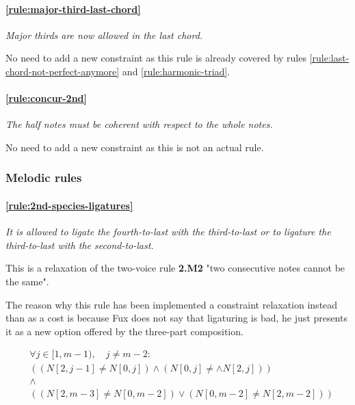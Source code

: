 \paragraph{\hspace{.5cm}\ref{rule:major-third-last-chord}} \textit{Major thirds are now allowed in the last chord.}

No need to add a new constraint as this rule is already covered by rules \ref{rule:last-chord-not-perfect-anymore} and \ref{rule:harmonic-triad}.

\paragraph{\hspace{.5cm}\ref{rule:concur-2nd}} \textit{The half notes must be coherent with respect to the whole notes.}

No need to add a new constraint as this is not an actual rule.

\subsubsection{Melodic rules}

    \paragraph{\hspace{.6cm}\ref{rule:2nd-species-ligatures}} \greendots \textit{It is allowed to ligate the fourth-to-last with the third-to-last or to ligature the third-to-last with the second-to-last.}  

    This is a relaxation of the two-voice rule \textbf{2.M2} "two consecutive notes cannot be the same".
    
    The reason why this rule has been implemented a constraint relaxation instead than as a cost is because Fux does not say that ligaturing is bad, he just presents it as a new option offered by the three-part composition.

    \begin{equation}
        \begin{aligned}
            &\forall j \in [1, m-1), \quad j \neq m-2:\\
            &((N[2, j-1] \neq N[0, j]) \land (N[0, j] \neq \land N[2, j])) \\
            &\land \\
            & ((N[2, m-3] \neq N[0, m-2]) \lor (N[0, m-2] \neq N[2, m-2]) )
        \end{aligned}
    \end{equation}

